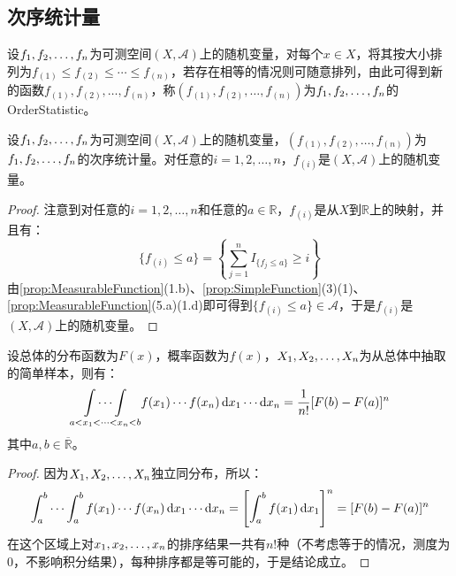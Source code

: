 \subsection{次序统计量}
\begin{definition}
	设$f_1, f_2, \dots, f_{n}$为可测空间$(X,\mathscr{A})$上的随机变量，对每个$x\in X$，将其按大小排列为$f_{(1)}\leqslant f_{(2)}\leqslant\cdots\leqslant f_{(n)}$，若存在相等的情况则可随意排列，由此可得到新的函数$f_{(1)},f_{(2)},\dots,f_{(n)}$，称$(f_{(1)},f_{(2)},\dots,f_{(n)})$为$f_1, f_2, \dots, f_{n}$的\gls{OrderStatistic}。
\end{definition}
\begin{property}\label{prop:OrderStatistics}
	设$f_1, f_2, \dots, f_{n}$为可测空间$(X,\mathscr{A})$上的随机变量，$(f_{(1)},f_{(2)},\dots,f_{(n)})$为$f_1, f_2, \dots, f_{n}$的次序统计量。对任意的$i=1,2,\dots,n$，$f_{(i)}$是$(X,\mathscr{A})$上的随机变量。
\end{property}
\begin{proof}
	注意到对任意的$i=1,2,\dots,n$和任意的$a\in\mathbb{R}$，$f_{(i)}$是从$X$到$\mathbb{R}$上的映射，并且有：
	\begin{equation*}
		\{f_{(i)}\leqslant a\}=\left\{\sum_{j=1}^{n}I_{\{f_j\leqslant a\}}\geqslant i\right\}
	\end{equation*}
	由\cref{prop:MeasurableFunction}(1.b)、\cref{prop:SimpleFunction}(3)(1)、\cref{prop:MeasurableFunction}(5.a)(1.d)即可得到$\{f_{(i)}\leqslant a\}\in\mathscr{A}$，于是$f_{(i)}$是$(X,\mathscr{A})$上的随机变量。
\end{proof}
\begin{lemma}\label{lem:OrderStatistics}
	设总体的分布函数为$F(x)$，概率函数为$f(x)$，$X_1, X_2, \dots, X_{n}$为从总体中抽取的简单样本，则有：
	\begin{equation*}
		\underset{a<x_1<\cdots<x_n<b}{\int\cdots\int}f(x_1)\cdots f(x_n)\mathop{}\!\mathrm{d} x_1\cdots\mathop{}\!\mathrm{d} x_n=\frac{1}{n!}[F(b)-F(a)]^n
	\end{equation*}
	其中$a,b\in\overline{\mathbb{R}}$。
\end{lemma}
\begin{proof}
	因为$X_1, X_2, \dots, X_{n}$独立同分布，所以：
	\begin{equation*}
		\int_{a}^{b}\cdots\int_{a}^{b}f(x_1)\cdots f(x_n)\mathop{}\!\mathrm{d} x_1\cdots\mathop{}\!\mathrm{d} x_n=\left[\int_{a}^{b}f(x_1)\mathop{}\!\mathrm{d} x_1\right]^n=[F(b)-F(a)]^n
	\end{equation*}
	在这个区域上对$x_1, x_2, \dots, x_{n}$的排序结果一共有$n!$种（不考虑等于的情况，测度为$0$，不影响积分结果），每种排序都是等可能的，于是结论成立。
\end{proof}
